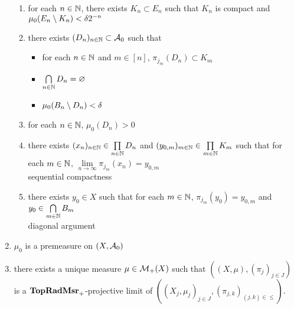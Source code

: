 \documentclass{book}
\begin{document}
\begin{ex}
\begin{enumerate}
\begin{enumerate}
			\item for each $n \in \mathbb{N}$, there exists $K_n \subset E_n$ such that $K_n$ is compact and $\mu_0(E_n \setminus K_n) < \delta2^{-n}$
			\item there exists $(D_n)_{n \in \mathbb{N}} \subset \mathcal{A}_0$ such that 
			\begin{itemize}
				\item for each $n \in \mathbb{N}$ and $m \in [n]$, $\pi_{j_m}(D_n) \subset K_m$ 
				\item $\bigcap\limits_{n \in \mathbb{N}} D_n = \varnothing$
				\item $\mu_0(B_n \setminus D_n) < \delta$
			\end{itemize}
			\item for each $n \in \mathbb{N}$, $\mu_0(D_n) > 0$ 
			\item there exists $(x_n)_{n \in \mathbb{N}} \in \prod\limits_{n \in \mathbb{N}} D_n$ and $(y_{0, m})_{m \in \mathbb{N}} \in \prod\limits_{m \in \mathbb{N}} K_m$ such that for each $m \in \mathbb{N}$, $\lim\limits_{n \rightarrow \infty} \pi_{j_m}(x_n) = y_{0,m}$ \\
			 sequential compactness
			\item there exists $y_0 \in X$ such that for each $m \in \mathbb{N}$, $\pi_{j_m}(y_0) = y_{0,m}$ and $y_0 \in \bigcap\limits_{m \in \mathbb{N}} B_m$\\
			 diagonal argument 
		\end{enumerate}
		\item $\mu_0$ is a premeasure on $(X, \mathcal{A}_0)$\\
		  
		\item there exists a unique measure $\mu \in \mathcal{M}_+(X)$ such that $((X, \mu), (\pi_j)_{j \in J})$ is a $\operatorname*{\text{\textbf{TopRadMsr}}_{+}}$-projective limit of $((X_j, \mu_j)_{j \in J}, (\pi_{j,k})_{(j,k) \in {\leq}})$. 
	\end{enumerate}
\end{ex}
	
\end{document}
